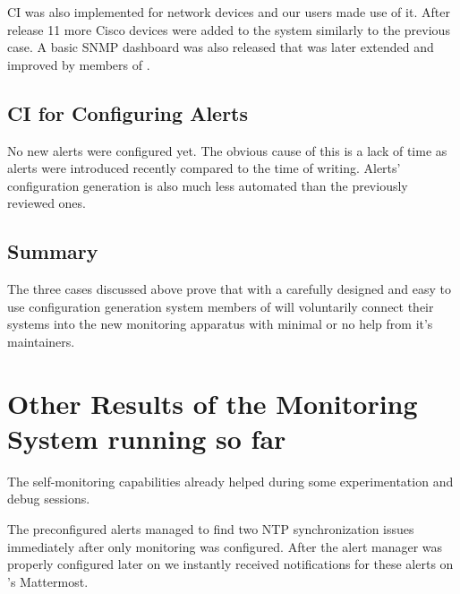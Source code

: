 CI was also implemented for network devices and our users made use of it. After
release 11 more Cisco devices were added to the system similarly to the
previous case. A basic SNMP dashboard was also released that was later extended
and improved by members of \kszk.

\subsection{CI for Configuring Alerts}

No new alerts were configured yet. The obvious cause of this is a lack of time
as alerts were introduced recently compared to the time of writing. Alerts'
configuration generation is also much less automated than the previously
reviewed ones.

\subsection{Summary}

The three cases discussed above prove that with a carefully designed and easy
to use configuration generation system members of \kszk will voluntarily
connect their systems into the new monitoring apparatus with minimal or no help
from it's maintainers.

\section{Other Results of the Monitoring System running so far}

The self-monitoring capabilities already helped during some experimentation and
debug sessions.

The preconfigured alerts managed to find two NTP synchronization issues
immediately after only monitoring was configured. After the alert manager was
properly configured later on we instantly received notifications for these
alerts on \kszk's Mattermost.

